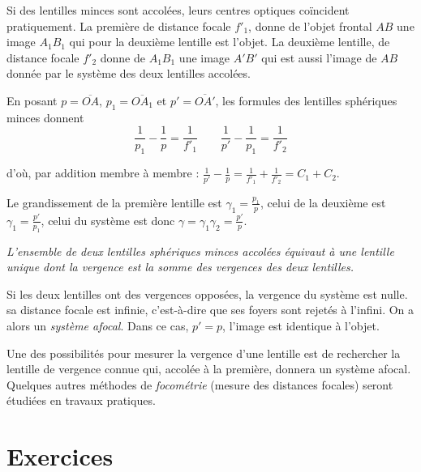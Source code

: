 Si des 	lentilles minces sont accolées, leurs centres optiques co\"incident pratiquement. La première de distance focale \(f'_1\), donne de l'objet frontal \(AB\) une image \(A_1B_1\) qui pour la deuxième lentille est l'objet. La deuxième lentille, de distance focale \(f'_2\) donne de \(A_1B_1\) une image \(A'B'\) qui est aussi l'image de \(AB\) donnée par le système des deux lentilles accolées.

En posant \(p = \overline{OA}\), \(p_1 = \overline{OA_1}\) et \(p' = \overline{OA'}\), les formules des lentilles sphériques minces donnent
\begin{equation}
  \frac{1}{p_1} - \frac{1}{p} = \frac{1}{f'_1} \qquad \frac{1}{p'} - \frac{1}{p_1} = \frac{1}{f'_2}
\end{equation}

d'où, par addition membre à membre : \(\frac{1}{p'} - \frac{1}{p} = \frac{1}{f'_1} + \frac{1}{f'_2} = C_1 + C_2\). 

Le grandissement de la première lentille est \(\gamma_1 = \frac{p_1}{p}\), celui de la deuxième est \(\gamma_1 = \frac{p'}{p_1}\), celui du système est donc \(\gamma = \gamma_1 \gamma_2 = \frac{p'}{p}\).

\emph{L'ensemble de deux lentilles sphériques minces accolées équivaut à une lentille unique dont la vergence est la somme des vergences des deux lentilles.}

Si les deux lentilles ont des vergences opposées, la vergence du système est nulle. sa distance focale est infinie, c'est-à-dire que ses foyers sont rejetés à l'infini. On a alors un \emph{système afocal}. Dans ce cas, \(p' = p\), l'image est identique à l'objet.

Une des possibilités pour mesurer la vergence d'une lentille est de rechercher la lentille de vergence connue qui, accolée à la première, donnera un système afocal. Quelques autres méthodes de \emph{focométrie} (mesure des distances focales) seront étudiées en travaux pratiques.

\section{Exercices}
\label{chap8-sec:exercices}

